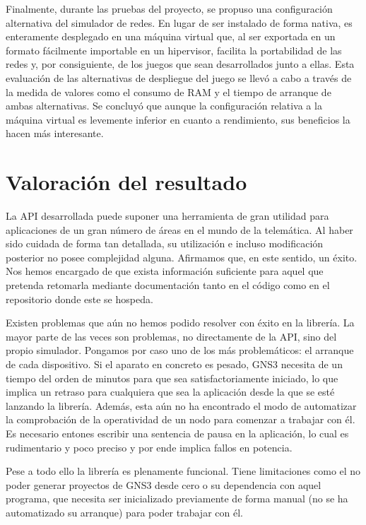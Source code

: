 Finalmente, durante las pruebas del proyecto, se propuso una configuración alternativa del simulador de redes. En lugar de ser instalado de forma nativa, es enteramente desplegado en una máquina virtual que, al ser exportada en un formato fácilmente importable en un hipervisor, facilita la portabilidad de las redes y, por consiguiente, de los juegos que sean desarrollados junto a ellas. Esta evaluación de las alternativas de despliegue del juego se llevó a cabo a través de la medida de valores como el consumo de RAM y  el tiempo de arranque de ambas alternativas. Se concluyó que aunque la configuración relativa a la máquina virtual es levemente inferior en cuanto a rendimiento, sus beneficios la hacen más interesante.

\section{Valoración del resultado}
La API desarrollada puede suponer una herramienta de gran utilidad para aplicaciones de un gran número de áreas en el mundo de la telemática. Al haber sido cuidada de forma tan detallada, su utilización e incluso modificación posterior no posee complejidad alguna. Afirmamos que, en este sentido, un éxito. Nos hemos encargado de que exista información suficiente para aquel que pretenda retomarla mediante documentación tanto en el código como en el repositorio donde este se hospeda.

Existen problemas que aún no hemos podido resolver con éxito en la librería. La mayor parte de las veces son problemas, no directamente de la API, sino del propio simulador. Pongamos por caso uno de los más problemáticos: el arranque de cada dispositivo. Si el aparato en concreto es pesado, GNS3 necesita de un tiempo del orden de minutos para que sea satisfactoriamente iniciado, lo que implica un retraso para cualquiera que sea la aplicación desde la que se esté lanzando la librería. Además, esta aún no ha encontrado el modo de automatizar la comprobación de la operatividad de un nodo para comenzar a trabajar con él. Es necesario entones escribir una sentencia de pausa en la aplicación, lo cual es rudimentario y poco preciso y por ende implica fallos en potencia.

Pese a todo ello la librería es plenamente funcional. Tiene limitaciones como el no poder generar proyectos de GNS3 desde cero o su dependencia con aquel programa, que necesita ser inicializado previamente de forma manual (no se ha automatizado su arranque) para poder trabajar con él.

